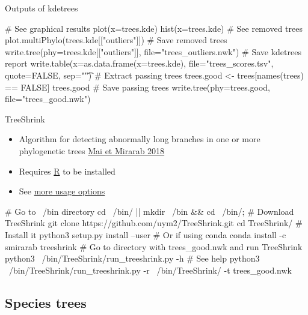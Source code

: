 \documentclass[compress, ucs, xelatex, 11pt, xcolor=x11names, aspectratio=169,
	hyperref={
		bookmarks=true,
		unicode=true,
		colorlinks=true,
		pdftitle={HybSeq course},
		plainpages=false,
		pdfauthor={Vojtech Zeisek},
		pdfsubject={Practical processing of HybSeq target enrichment sequencing data on computing grids like MetaCentrum},
		pdfcreator={XeLaTeX},
		pdfkeywords={BASH, command line, GNU, HybSeq, Linux, MetaCentrum, sequencing shell, target enrichment},
		linkcolor=Cyan2, %
		anchorcolor=Firebrick2, %
		citecolor=Firebrick2, %
		filecolor=Firebrick2, %
		menucolor=Firebrick2, %
		urlcolor=Chartreuse2, %
		pdftex},
	url={hyphens, lowtilde} %
	]{beamer}
\begin{document}
\begin{frame}[fragile]{Outputs of kdetrees}
	\begin{spluscode}
    # See graphical results
    plot(x=trees.kde)
    hist(x=trees.kde)
    # See removed trees
    plot.multiPhylo(trees.kde[["outliers"]])
    # Save removed trees
    write.tree(phy=trees.kde[["outliers"]], file="trees_outliers.nwk")
    # Save kdetrees report
    write.table(x=as.data.frame(x=trees.kde), file="trees_scores.tsv",
      quote=FALSE, sep="\t")
    # Extract passing trees
    trees.good <- trees[names(trees) %
      == FALSE]
    trees.good
    # Save passing trees
    write.tree(phy=trees.good, file="trees_good.nwk")
	\end{spluscode}
\end{frame}

\begin{frame}[fragile]{TreeShrink}
	\begin{itemize}
		\item Algorithm for detecting abnormally long branches in one or more phylogenetic trees \href{https://bmcgenomics.biomedcentral.com/articles/10.1186/s12864-018-4620-2}{Mai et Mirarab 2018}
		\item Requires \href{https://www.r-project.org/}{R} to be installed
		\item See \href{https://github.com/uym2/TreeShrink}{more usage options}
	\end{itemize}
	\begin{bashcode}
    # Go to ~/bin directory
    cd ~/bin/ || { mkdir ~/bin && cd ~/bin/; }
    # Download TreeShrink
    git clone https://github.com/uym2/TreeShrink.git
    cd TreeShrink/
    # Install it
    python3 setup.py install --user # Or if using conda
    conda install -c smirarab treeshrink
    # Go to directory with trees_good.nwk and run TreeShrink
    python3 ~/bin/TreeShrink/run_treeshrink.py -h # See help
    python3 ~/bin/TreeShrink/run_treeshrink.py -r ~/bin/TreeShrink/
      -t trees_good.nwk
	\end{bashcode}
\end{frame}

\subsection{Species trees}
\end{document}
